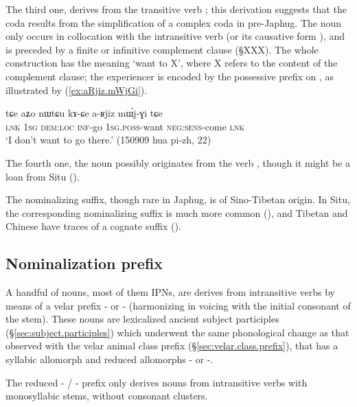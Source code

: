 The third one,  derives from the transitive verb ; this derivation suggests that the coda  results from the simplification of a complex coda  in pre-Japhug. The noun  only occurs in collocation with the intransitive verb  (or its causative form ), and is preceded by a finite or infinitive complement clause (§XXX). The whole construction has the meaning `want to X', where X refers to the content of the complement clause; the experiencer is encoded by the possessive prefix on , as illustrated by (\ref{ex:aRjiz.mWjGi}).

\begin{exe}
\ex \label{ex:aRjiz.mWjGi}
\gll  tɕe aʑo nɯtɕu kɤ-ɕe a-ʁjiz mɯ́j-ɣi tɕe \\
\textsc{lnk} \textsc{1sg} \textsc{dem}:\textsc{loc} \textsc{inf}-go \textsc{1sg}.\textsc{poss}-want \textsc{neg}:\textsc{sens}-come \textsc{lnk} \\
\glt `I don't want to go there.' (150909 hua pi-zh, 22)
\end{exe}

The fourth one, the noun  possibly originates from the verb , though it might be a loan from Situ (\citealt{jacques03s.houzhui}). 

The  nominalizing suffix, though rare in Japhug, is of Sino-Tibetan origin. In Situ, the corresponding nominalizing  suffix is much more common (\citealt{jacques03s.houzhui}), and Tibetan and Chinese have traces of a cognate suffix (\citealt{jacques16ssuffixes}).


\subsection{Nominalization  prefix} \label{sec:G.nmlz}
A handful of nouns, most of them IPNs, are derives from intransitive verbs by means of a velar prefix  - or - (harmonizing in voicing with the initial consonant of the stem). These nouns are lexicalized ancient subject participles (§\ref{sec:subject.participles}) which underwent the same phonological change as that observed with the velar animal class prefix (§\ref{sec:velar.class.prefix}), that has a syllabic allomorph  and reduced allomorphs - or -. 

The reduced - / - prefix only derives nouns from intransitive verbs with monosyllabic stems, without consonant clusters. 



